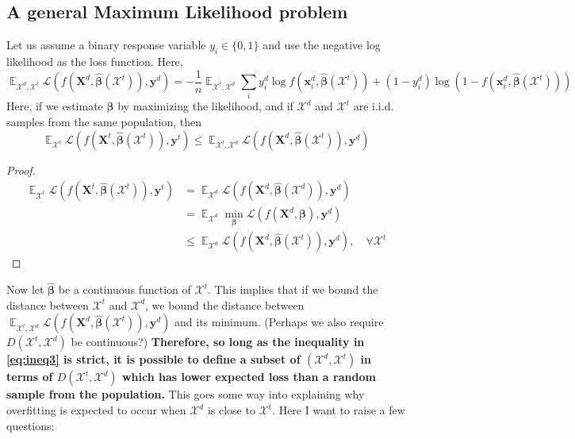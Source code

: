 \documentclass[12pt]{article}
\DeclareMathOperator{\E}{\mathbb{E}}
\begin{document}
	\subsection*{A general Maximum Likelihood problem}
	Let us assume a binary response variable $y_i \in \{ 0,1 \}$ and use the negative log likelihood as the loss function. Here, 
	\begin{equation}
	\E_{\mathcal{X}^d, \mathcal{X}^t} \mathcal{L} (f(\boldsymbol{X}^d, \hat{\boldsymbol{\beta}}(\mathcal{X}^t)), \boldsymbol{y}^d) = -\frac{1}{n} \E_{\mathcal{X}^t, \mathcal{X}^d} \sum_i y^d_i \log f(\boldsymbol{x}^d_i, \hat{\boldsymbol{\beta}}(\mathcal{X}^t)) + (1- y^d_i) \log (1 - f(\boldsymbol{x}^d_i, \hat{\boldsymbol{\beta}}(\mathcal{X}^t))) 
	\end{equation}	
	Here, if we estimate $\boldsymbol{\beta}$ by maximizing the likelihood, and if $\mathcal{X}^d$ and $\mathcal{X}^t$ are i.i.d. samples from the same population, then
	\begin{equation}
	\E_{\mathcal{X}^t} \mathcal{L} (f(\boldsymbol{X}^t, \hat{\boldsymbol{\beta}}(\mathcal{X}^t)), \boldsymbol{y}^t) \leq \E_{\mathcal{X}^t, \mathcal{X}^d} \mathcal{L} (f(\boldsymbol{X}^d, \hat{\boldsymbol{\beta}}(\mathcal{X}^t)), \boldsymbol{y}^d) \label{eq:ineq3}
	\end{equation}	
	\begin{proof}
		\begin{align}
		\E_{\mathcal{X}^t} \mathcal{L} (f(\boldsymbol{X}^t, \hat{\boldsymbol{\beta}}(\mathcal{X}^t)), \boldsymbol{y}^t) &= 
		\E_{\mathcal{X}^d} \mathcal{L} (f(\boldsymbol{X}^d, \hat{\boldsymbol{\beta}}(\mathcal{X}^d)), \boldsymbol{y}^d) \\ &= 
		\E_{\mathcal{X}^d} \underset{\boldsymbol{\beta}}{\min} \mathcal{L} (f(\boldsymbol{X}^d, \boldsymbol{\beta}), \boldsymbol{y}^d) \\ &\leq \E_{\mathcal{X}^d} \mathcal{L} (f(\boldsymbol{X}^d, \hat{\boldsymbol{\beta}}(\mathcal{X}^t)), \boldsymbol{y}^d), \quad \forall \mathcal{X}^t
		\end{align}
	\end{proof}
	Now let $\hat{\boldsymbol{\beta}}$ be a continuous function of $\mathcal{X}^t$. This implies that if we bound the distance between $\mathcal{X}^t$ and $\mathcal{X}^d$, we bound the distance between $\E_{\mathcal{X}^t, \mathcal{X}^d} \mathcal{L} (f(\boldsymbol{X}^d, \hat{\boldsymbol{\beta}}(\mathcal{X}^t)), \boldsymbol{y}^d)$ and its minimum. (Perhaps we also require $D(\mathcal{X}^t, \mathcal{X}^d)$ be continuous?) \textbf{Therefore, so long as the inequality in \eqref{eq:ineq3} is strict, it is possible to define a subset of $(\mathcal{X}^d, \mathcal{X}^t)$ in terms of $D(\mathcal{X}^t, \mathcal{X}^d)$ which has lower expected loss than a random sample from the population.} This goes some way into explaining why overfitting is expected to occur when $\mathcal{X}^d$ is close to $\mathcal{X}^t$. Here I want to raise a few questions: 
	
\end{document}
